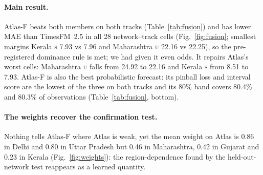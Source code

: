 \documentclass{article}
\newcommand{\trk}[1]{\textsc{#1}}
\begin{document}
\paragraph{Main result.} Atlas-F beats both members on both tracks (Table~\ref{tab:fusion}) and has lower MAE than
TimesFM~2.5 in all 28 network--track cells (Fig.~\ref{fig:fusion}; smallest margins Kerala \trk{s} 7.93 vs 7.96 and
Maharashtra \trk{u} 22.16 vs 22.25), so the pre-registered dominance rule is met; we had given it even odds. It repairs
Atlas's worst cells: Maharashtra \trk{u} falls from 24.92 to 22.16 and Kerala \trk{s} from 8.51 to 7.93. Atlas-F is also the best probabilistic forecast: its pinball loss and interval score are the lowest of the three on both tracks and its 80\% band covers 80.4\% and 80.3\% of observations (Table~\ref{tab:fusion}, bottom).

\paragraph{The weights recover the confirmation test.} Nothing tells Atlas-F where Atlas is weak, yet the mean weight on
Atlas is 0.86 in Delhi and 0.80 in Uttar Pradesh but 0.46 in Maharashtra, 0.42 in Gujarat and 0.23 in Kerala
(Fig.~\ref{fig:weights}): the region-dependence found by the held-out-network test reappears as a learned quantity.
\end{document}
